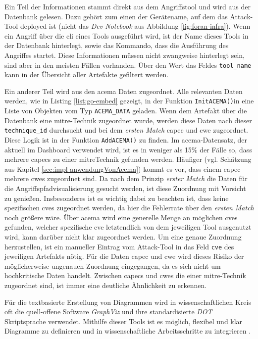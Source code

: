 \par Ein Teil der Informationen stammt direkt aus dem Angriffstool und wird aus der Datenbank gelesen. Dazu gehört zum einen der Gerätename, auf dem das Attack-Tool deployed ist (nicht das \textit{Dev Notebook} aus Abbildung \ref{fig:foran-infra}). Wenn ein Angriff über die \gls{cli} eines Tools ausgeführt wird, ist der Name dieses Tools in der Datenbank hinterlegt, sowie das Kommando, dass die Ausführung des Angriffes startet. Diese Informationen müssen nicht zwangweise hinterlegt sein, sind aber in den meisten Fällen vorhanden. Über den Wert das Feldes \verb|tool_name| kann in der Übersicht aller Artefakte gefiltert werden.
\par Ein anderer Teil wird aus den \gls{acema} Daten zugeordnet. Alle relevanten Daten werden, wie in Listing \ref{list:go-embed} gezeigt, in der Funktion \verb|InitACEMA()|in eine Liste von Objekten vom Typ \verb|ACEMA_DATA| geladen. Wenn dem Artefakt über die Datenbank eine \gls{mitre}-Technik zugeordnet wurde, werden diese Daten nach dieser \verb|technique_id| durchsucht und bei dem \textit{ersten Match} \gls{capec} und \gls{cwe} zugeordnet. Diese Logik ist in der Funktion \verb|AddACEMA()| zu finden. Im \gls{acema}-Datensatz, der aktuell im Dashboard verwendet wird, ist es in weniger als 15\% der Fälle so, dass mehrere \glspl{capec} zu einer \gls{mitre}Technik gefunden werden. Häufiger (vgl. Schätzung aus Kapitel \ref{sec:impl-anwendungVonAcema}) kommt es vor, dass einem \gls{capec} mehrere \glspl{cwe} zugeordnet sind. Da nach dem Prinzip \textit{erster Match} die Daten für die Angriffspfadvisualisierung gesucht werden, ist diese Zuordnung mit Vorsicht zu genießen. Insbesonderes ist es wichtig dabei zu beachten ist, dass keine spezifischen \glspl{cve} zugeordnet werden, da hier die Fehlerrate über den \textit{ersten Match} noch größere wäre. Über \gls{acema} wird eine generelle Menge an möglichen \glspl{cve} gefunden, welcher spezifische \gls{cve} letztendlich von dem jeweiligen Tool ausgenutzt wird, kann darüber nicht klar zugeordnet werden. Um eine genaue Zuordnung herzustellen, ist ein manueller Eintrag vom Attack-Tool in das Feld \verb|cve| des jeweiligen Artefakts nötig. Für die Daten \gls{capec} und \gls{cwe} wird dieses Risiko der möglicherweise ungenauen Zuordnung eingegangen, da es sich nicht um hochkritische Daten handelt. Zwischen \glspl{capec} und \glspl{cwe} die einer \gls{mitre}-Technik zugeordnet sind, ist immer eine deutliche Ähnlichkeit zu erkennen.
\par Für die textbasierte Erstellung von Diagrammen wird in wissenschaftlichen Kreis oft die quell-offene Software \textit{GraphViz} und ihre standardisierte \textit{DOT} Skriptsprache verwendet. Mithilfe dieser Tools ist es möglich, flexibel und klar Diagramme zu definieren und in wissenschaftliche Arbeitsschritte zu integrieren \autocite{Graphviz} \autocite{DOTLanguage}.

